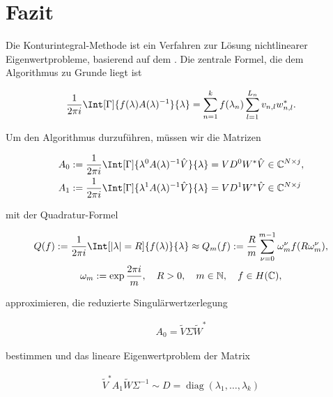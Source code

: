 \chapter{Fazit}

Die Konturintegral-Methode ist ein Verfahren zur Lösung nichtlinearer Eigenwertprobleme, basierend auf dem .
Die zentrale Formel, die dem Algorithmus zu Grunde liegt ist

\begin{gather*}
    \frac{1}{2 \pi i}
    \Int[\Gamma]{f(\lambda) A(\lambda)^{-1}}{\lambda}
    =
    \sum_{n=1}^k
        f(\lambda_n)
        \sum_{l=1}^{L_n}
            v_{n, l} w_{n, l}^\ast.
\end{gather*}

Um den Algorithmus durzuführen, müssen wir die Matrizen

\begin{align*}
    A_0
    & :=
    \frac{1}{2 \pi i}
    \Int[\Gamma]{\lambda^0 A(\lambda)^{-1} \hat V}{\lambda}
    =
    V D^0 W^\ast \hat V
    \in
    \C^{N \times j}, \\
    A_1
    & :=
    \frac{1}{2 \pi i}
    \Int[\Gamma]{\lambda^1 A(\lambda)^{-1} \hat V}{\lambda}
    =
    V D^1 W^\ast \hat V
    \in
    \C^{N \times j}
\end{align*}

mit der Quadratur-Formel

\begin{gather*}
    Q(f)
    :=
    \frac{1}{2 \pi i}
    \Int[|\lambda| = R]{f(\lambda)}{\lambda}
    \approx
    Q_m(f)
    :=
    \frac{R}{m}
    \sum_{\nu = 0}^{m-1}
        \omega_m^\nu f(R \omega_m^\nu), \\
    \omega_m
    :=
    \exp \frac{2 \pi i}{m},
    \quad
    R > 0,
    \quad
    m \in \N,
    \quad
    f \in H(\C),
\end{gather*}

approximieren, die reduzierte Singulärwertzerlegung

\begin{align*}
    A_0
    =
    \tilde V \Sigma \tilde W^\ast
\end{align*}

bestimmen und das lineare Eigenwertproblem der Matrix

\begin{align*}
    \tilde V^\ast A_1 \tilde W \Sigma^{-1}
    \sim
    D
    =
    \operatorname{diag}(\lambda_1, \dots, \lambda_k)
\end{align*}

